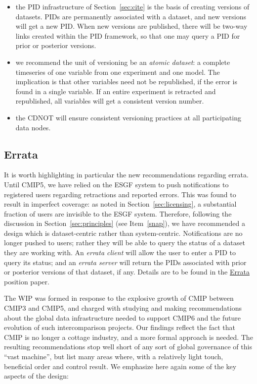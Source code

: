 \documentclass[gmd,manuscript]{copernicus}
\newcommand{\secref}[1] {\mbox{Section  \ref{sec:#1}}}
\begin{document}
\begin{itemize}
\item the PID infrastructure of \secref{cite} is the basis of creating
  versions of datasets. PIDs are permanently associated with a
  dataset, and new versions will get a new PID. When new versions are
  published, there will be two-way links created within the PID
  framework, so that one may query a PID for prior or posterior versions.
\item we recommend the unit of versioning be an \emph{atomic dataset}:
  a complete timeseries of one variable from one experiment and one
  model. The implication is that other variables need not be
  republished, if the error is found in a single variable. If an
  entire experiment is retracted and republished, all variables will
  get a consistent version number.
\item the CDNOT will ensure consistent versioning practices at all
  participating data nodes.
\end{itemize}

\subsection{Errata}
\label{sec:errata}

It is worth highlighting in particular the new recommendations
regarding errata. Until CMIP5, we have relied on the ESGF system to
push notifications to registered users regarding retractions and
reported errors. This was found to result in imperfect coverage: as
noted in \secref{licensing}, a substantial fraction of users are
invisible to the ESGF system. Therefore, following the discussion in
\secref{principles} (see Item~\ref{snap}), we have recommended a
design which is dataset-centric rather than system-centric.
Notifications are no longer pushed to users; rather they will be able
to query the status of a dataset they are working with. An
\emph{errata client} will allow the user to enter a PID to query its
status; and an \emph{errata server} will return the PIDs associated
with prior or posterior versions of that dataset, if any. Details are
to be found in the \href{https://goo.gl/fvVTVo}{Errata} position
paper.

\label{sec:summary}

The WIP was formed in response to the explosive growth of CMIP between
CMIP3 and CMIP5, and charged with studying and making recommendations
about the global data infrastructure needed to support CMIP6 and the
future evolution of such intercomparison projects. Our findings reflect 
the fact that CMIP is no longer a cottage industry, and a more formal 
approach is needed. The resulting recommendations stop well short of 
any sort of global governance of this ``vast machine'', but list many 
areas where, with a relatively light touch, beneficial order and 
control result. We emphasize here again some of the key aspects of 
the design:
\end{document}
